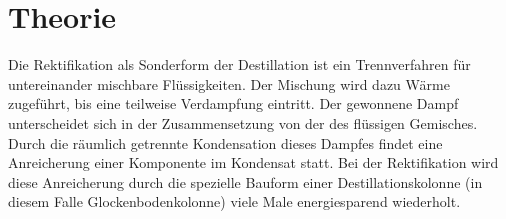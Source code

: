 \section{Theorie}
\label{sec:theorie}

Die Rektifikation als Sonderform der Destillation ist ein Trennverfahren für untereinander mischbare Flüssigkeiten. Der Mischung wird dazu Wärme zugeführt, bis eine teilweise Verdampfung eintritt. Der gewonnene Dampf unterscheidet sich in der Zusammensetzung von der des flüssigen Gemisches. Durch die räumlich getrennte Kondensation dieses Dampfes findet eine Anreicherung einer Komponente im Kondensat statt. Bei der Rektifikation wird diese Anreicherung durch die spezielle Bauform einer Destillationskolonne (in diesem Falle Glockenbodenkolonne) viele Male energiesparend wiederholt.